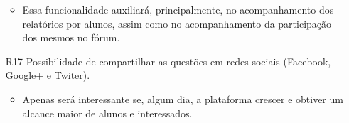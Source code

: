 \documentclass[graduacao,brazil]{ThesisPUC}
\begin{document}
\begin{itemize}
  \begin{itemize}
    \item Essa funcionalidade auxiliar\'{a}, principalmente, no acompanhamento dos relat\'{o}rios
	  por alunos, assim como no acompanhamento da participa\c{c}\~{a}o dos mesmos no f\'{o}rum.
  \end{itemize}
  \item [R17] Possibilidade de compartilhar as quest\~{o}es em redes sociais (Facebook, Google+ e Twiter).
  \begin{itemize}
    \item Apenas ser\'{a} interessante se, algum dia, a plataforma crescer e obtiver um alcance maior
	  de alunos e interessados.
  \end{itemize}
\end{itemize}


\arial


\normalfont
\end{document}
